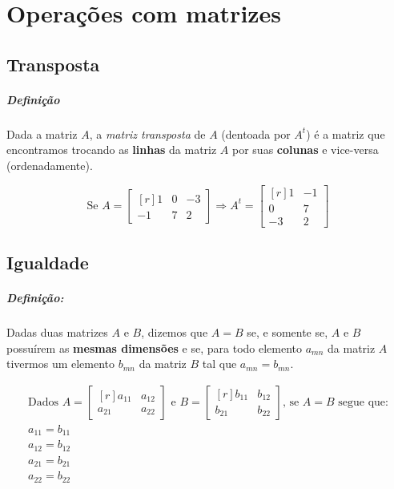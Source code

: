 \chapter{Operações com matrizes}
\label{chap:opermat}

\section{Transposta}

\paragraph{Definição}

Dada a matriz $A$, a \textit{matriz transposta} de $A$ (dentoada por $A^t$) é a matriz que encontramos trocando as \textbf{linhas} da matriz $A$ por suas \textbf{colunas} e vice-versa (ordenadamente).

\Example

$$
\text{Se } A=\begin{bmatrix*}[r]
1 & 0 & -3 \\
-1 & 7 & 2
\end{bmatrix*}
\Rightarrow A^t=\begin{bmatrix*}[r]
1 & -1 \\
0 & 7 \\
-3 & 2
\end{bmatrix*}
$$

\section{Igualdade}

\paragraph{Definição:}

Dadas duas matrizes $A$ e $B$, dizemos que $A=B$ se, e somente se, $A$ e $B$ possuírem as \textbf{mesmas dimensões} e se, para todo elemento $a_{mn}$ da matriz $A$ tivermos um elemento $b_{mn}$ da matriz $B$ tal que $a_{mn}=b_{mn}$.

\Example

\begin{gather*}
\text{Dados } A=\begin{bmatrix*}[r]
a_{11} & a_{12} \\
a_{21} & a_{22}
\end{bmatrix*}
\text{ e }
B=\begin{bmatrix*}[r]
b_{11} & b_{12} \\
b_{21} & b_{22}
\end{bmatrix*}
\text{, se } A=B \text{ segue que:} \\
a_{11} = b_{11} \\
a_{12} = b_{12} \\
a_{21} = b_{21} \\
a_{22} = b_{22}
\end{gather*}

